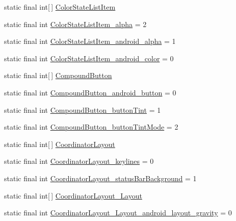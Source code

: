 \begin{CompactItemize}
\item 
static final int\mbox{[}$\,$\mbox{]} \hyperlink{classandroid_1_1support_1_1v4_1_1_r_1_1styleable_47476cf7ffe4d9c8245bd3670938eac6}{ColorStateListItem}
\item 
static final int \hyperlink{classandroid_1_1support_1_1v4_1_1_r_1_1styleable_92c3b7f9f52eb178ae6c53c479c310a1}{ColorStateListItem\_\-alpha} = 2
\item 
static final int \hyperlink{classandroid_1_1support_1_1v4_1_1_r_1_1styleable_022a829047dedadde86b69a4e39c03b9}{ColorStateListItem\_\-android\_\-alpha} = 1
\item 
static final int \hyperlink{classandroid_1_1support_1_1v4_1_1_r_1_1styleable_b79c06c660ce3527b4a6be6d89f1f6c4}{ColorStateListItem\_\-android\_\-color} = 0
\item 
static final int\mbox{[}$\,$\mbox{]} \hyperlink{classandroid_1_1support_1_1v4_1_1_r_1_1styleable_0f66eed6935e1b8ebc6b74c5e0089183}{CompoundButton}
\item 
static final int \hyperlink{classandroid_1_1support_1_1v4_1_1_r_1_1styleable_af18b699c10e7dee1620c5afb1bcde5a}{CompoundButton\_\-android\_\-button} = 0
\item 
static final int \hyperlink{classandroid_1_1support_1_1v4_1_1_r_1_1styleable_cb33184620c870325a8b7e37e0b99eca}{CompoundButton\_\-buttonTint} = 1
\item 
static final int \hyperlink{classandroid_1_1support_1_1v4_1_1_r_1_1styleable_47f68c1e5646a0561d3c3e5ba109c9f3}{CompoundButton\_\-buttonTintMode} = 2
\item 
static final int\mbox{[}$\,$\mbox{]} \hyperlink{classandroid_1_1support_1_1v4_1_1_r_1_1styleable_435a678f97c5e5874614dce39be62fcb}{CoordinatorLayout}
\item 
static final int \hyperlink{classandroid_1_1support_1_1v4_1_1_r_1_1styleable_c20576c71d93334eef8aed7debc2efde}{CoordinatorLayout\_\-keylines} = 0
\item 
static final int \hyperlink{classandroid_1_1support_1_1v4_1_1_r_1_1styleable_e232b9f25b14bea864d27c7645390f60}{CoordinatorLayout\_\-statusBarBackground} = 1
\item 
static final int\mbox{[}$\,$\mbox{]} \hyperlink{classandroid_1_1support_1_1v4_1_1_r_1_1styleable_002d98b0482bfb71440db629b16e17bf}{CoordinatorLayout\_\-Layout}
\item 
static final int \hyperlink{classandroid_1_1support_1_1v4_1_1_r_1_1styleable_65760d32d26a5a8a75ef8cc2e6386db7}{CoordinatorLayout\_\-Layout\_\-android\_\-layout\_\-gravity} = 0
\item 

\end{CompactItemize}
